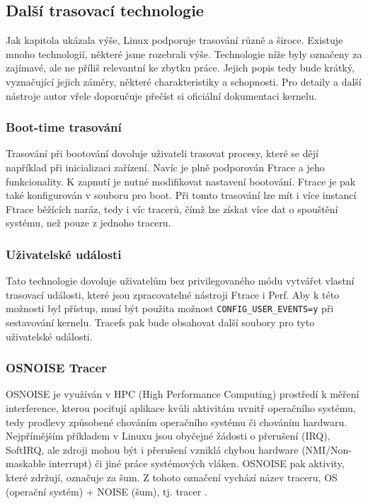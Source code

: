 \subsection{Další trasovací technologie}

Jak kapitola ukázala výše, Linux podporuje trasování různě a široce. Existuje mnoho technologií, některé jsme rozebrali výše. Technologie níže byly označeny za zajímavé, ale ne příliš relevantní ke zbytku práce. Jejich popis tedy bude krátký, vyznačující jejich záměry, některé charakteristiky a schopnosti. Pro detaily a další nástroje autor vřele doporučuje přečíst si oficiální dokumentaci kernelu.

\subsubsection*{Boot-time trasování}

Trasování při bootování dovoluje uživateli trasovat procesy, které se dějí například při inicializaci zařízení. Navíc je plně podporován Ftrace a jeho funkcionality. K zapnutí je nutné modifikovat nastavení bootování. Ftrace je pak také konfigurován v souboru pro boot. Při tomto trasování lze mít i více instancí Ftrace běžících naráz, tedy i víc tracerů, čímž lze získat více dat o spouštění systému, než pouze z jednoho traceru.

\subsubsection*{Uživatelské události}

Tato technologie dovoluje uživatelům bez privilegovaného módu vytvářet vlastní trasovací události, které jsou zpracovatelné nástroji Ftrace i Perf. Aby k této možnosti byl přístup, musí být použita možnost \texttt{CONFIG\_USER\_EVENTS=y} při sestavování kernelu. Tracefs pak bude obsahovat další soubory pro tyto uživatelské události.

\subsubsection*{OSNOISE Tracer}

OSNOISE je využíván v HPC (High Performance Computing) prostředí k měření interference, kterou pociťují aplikace kvůli aktivitám uvnitř operačního systému, tedy prodlevy způsobené chováním operačního systému či chováním hardwaru. Nejpřímějším příkladem v Linuxu jsou obyčejné žádosti o přerušení (IRQ), SoftIRQ, ale zdroji mohou být i přerušení vzniklá chybou hardware (NMI/Non-maskable interrupt) či jiné práce systémových vláken. OSNOISE pak aktivity, které zdržují, označuje za šum. Z tohoto označení vychází název traceru, OS (operační systém) + NOISE (šum), tj. tracer .

